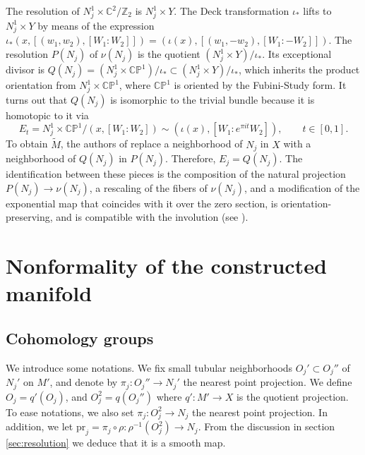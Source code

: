 \documentclass[10pt]{article}
\newcommand{\Z}{\mathbb Z}
\newcommand{\CC}{\mathbb{C}}
\newcommand{\CP}{\mathbb{CP}}
\theoremstyle{plain}
\theoremstyle{definition}
\theoremstyle{remark}
\begin{document}
The resolution of $N_j^1\times \CC^2/\Z_2$ is $N_j^1\times Y$. 
The Deck transformation $\iota_*$ lifts to
 $N_j^1\times Y$ by means of the expression $\iota_*(x,[(w_1,w_2),[W_1:W_2]])=(\iota(x),[(w_1,-w_2), [W_1:-W_2]])$. The resolution $P(N_j)$ of $\nu(N_j)$ is the quotient $(N_j^1\times Y)/\iota_*$. Its exceptional divisor is
$Q(N_j)=(N_j^1\times \CP^1)/\iota_* \subset (N_j^1\times Y)/\iota_*$, which inherits the product orientation from $N_j^1\times \CP^1$, where $\CP^1$ is oriented by the Fubini-Study form. It turns out that $Q(N_j)$ is isomorphic to the trivial bundle because it is homotopic to it via
\begin{equation} \label{eqn:homotopy}
E_t=N_j^1\times \CP^1/(x,[W_1:W_2])\sim (\iota(x),[W_1:e^{\pi i t}W_2]), \qquad t \in [0,1].
\end{equation}
To obtain $\widetilde{M}$, the authors of \cite{JK} replace a neighborhood of $N_j$ in $X$ with a neighborhood of $Q(N_j)$ in $P(N_j)$. Therefore, $E_j=Q(N_j)$. The identification between these pieces is the composition of the natural projection $P(N_j)\to \nu(N_j)$, a rescaling of the fibers of $\nu(N_j)$, and a 
 modification of the exponential map that coincides with it over the zero section, is orientation-preserving, and is compatible with the involution (see \cite[Definition 3.2, equation (6.1)]{JK}).





\section{Nonformality of the constructed manifold} \label{sec:nonformality}

\subsection{Cohomology groups} \label{sec:cgroups}

We introduce some notations. We fix small tubular neighborhoods $O_j'\subset O_j''$ of $N_j'$ on $M'$, and denote by $\pi_j \colon O_j'' \to N_j'$ the nearest point projection. We define $O_j=q'(O_j)$, and $O_j^2=q(O_j'')$ where $q'\colon M' \to X$ is the quotient projection. To ease notations, we also set  $\pi_j \colon O_j^2 \to N_j$ the nearest point projection. In addition, we let $\mathrm{pr}_j= \pi_j \circ \rho \colon \rho^{-1}(O_j^2) \to N_j$. From the discussion in section \ref{sec:resolution} we deduce that it is a smooth map.
\end{document}
